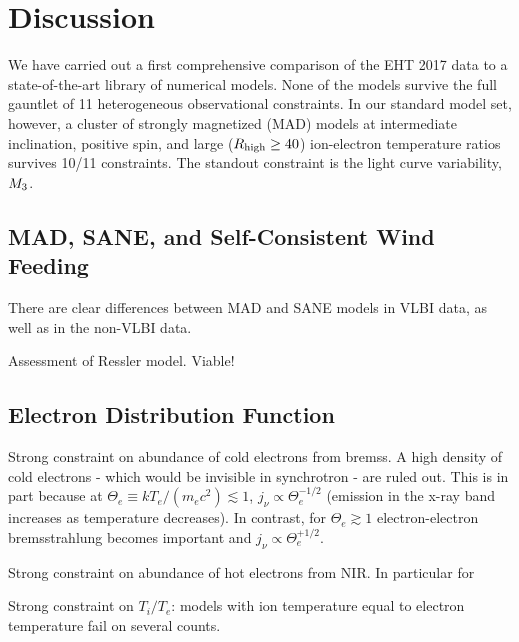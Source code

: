 \section{Discussion}
\label{sec:discussions}

We have carried out a first comprehensive comparison of the EHT 2017 \sgra data to a state-of-the-art library of numerical models.  None of the models survive the full gauntlet of 11 heterogeneous observational constraints.  In our standard model set, however, a cluster of strongly magnetized (MAD) models at intermediate inclination, positive spin, and large ($R_\mathrm{high} \ge 40$) ion-electron temperature ratios survives 10/11 constraints.  The standout constraint is the light curve variability, $M_{3}$.


\subsection{MAD, SANE, and Self-Consistent Wind Feeding}


There are clear differences between MAD and SANE models in VLBI data, as well as in the non-VLBI data.

Assessment of Ressler model.  Viable!

\subsection{Electron Distribution Function}


Strong constraint on abundance of cold electrons from bremss.  A high density of cold electrons - which would be invisible in synchrotron - are ruled out.  This is in part because at $\Theta_e \equiv k T_e/(m_e c^2) \lesssim 1$, $j_\nu \propto \Theta_e^{-1/2}$ (emission in the x-ray band increases as temperature decreases).  In contrast, for $\Theta_e \gtrsim 1$ electron-electron bremsstrahlung becomes important and $j_\nu \propto \Theta_e^{+1/2}$.

Strong constraint on abundance of hot electrons from NIR.  In particular for

Strong constraint on $T_i/T_e$: models with ion temperature equal to electron temperature fail on several counts.

